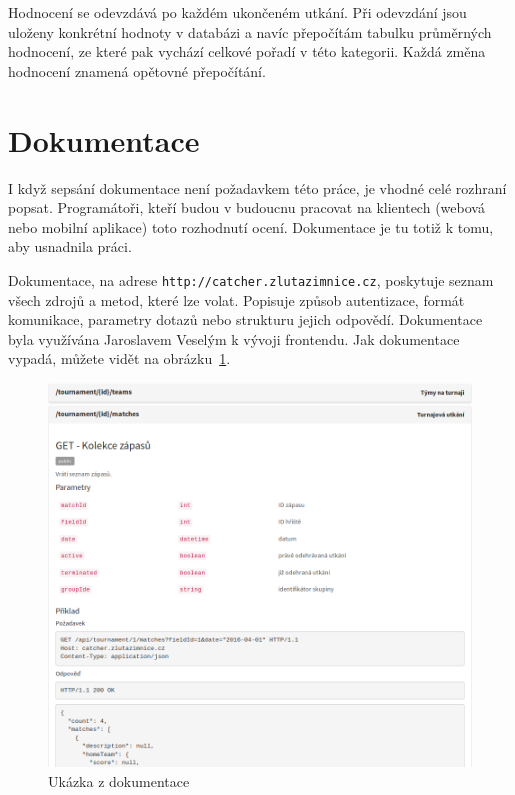 Hodnocení se odevzdává po každém ukončeném utkání. Při odevzdání jsou uloženy konkrétní hodnoty
v databázi a navíc přepočítám tabulku průměrných hodnocení, ze které pak vychází celkové pořadí v této kategorii.
Každá změna hodnocení znamená opětovné přepočítání.

\section{Dokumentace}


I když sepsání dokumentace není požadavkem této práce, je vhodné celé rozhraní popsat. Programátoři,
kteří budou v budoucnu pracovat na klientech (webová nebo mobilní aplikace) toto rozhodnutí ocení.
Dokumentace je tu totiž k tomu, aby usnadnila práci.

Dokumentace, na adrese \texttt{http://catcher.zlutazimnice.cz},
poskytuje seznam všech zdrojů a metod, které lze volat. Popisuje způsob autentizace,
formát komunikace, parametry dotazů nebo strukturu jejich odpovědí.
Dokumentace byla využívána Jaroslavem Veselým k vývoji frontendu. Jak dokumentace vypadá, můžete vidět na obrázku~\ref{fig:doc}.

\begin{figure}[ht!]
\centering
\includegraphics[width=130mm]{./images/doc.png}
\caption{Ukázka z dokumentace\label{overflow}}
\label{fig:doc}
\end{figure}



